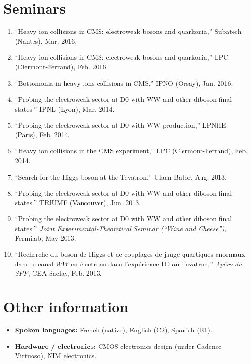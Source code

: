 \documentclass[a4paper,11pt]{article}
\begin{document}
\section*{Seminars}

 \begin{enumerate}
 \item ``Heavy ion collisions in CMS: electroweak bosons and quarkonia,'' Subatech (Nantes), Mar. 2016.
 \item ``Heavy ion collisions in CMS: electroweak bosons and quarkonia,'' LPC (Clermont-Ferrand), Feb. 2016.
 \item ``Bottomonia in heavy ions collisions in CMS,'' IPNO (Orsay), Jan. 2016.
 \item ``Probing the electroweak sector at D0 with WW and other diboson final states,'' IPNL (Lyon), Mar. 2014.
 \item ``Probing the electroweak sector at D0 with WW production,'' LPNHE (Paris), Feb. 2014.
 \item ``Heavy ion collisions in the CMS experiment,'' LPC (Clermont-Ferrand), Feb. 2014.
 \item ``Search for the Higgs boson at the Tevatron,'' Ulaan Bator, Aug. 2013.
 \item ``Probing the electroweak sector at D0 with WW and other diboson final states,'' TRIUMF (Vancouver), Jun. 2013.
 \item ``Probing the electroweak sector at D0 with WW and other diboson final states,'' \emph{Joint 
Experimental-Theoretical Seminar (``Wine and Cheese'')}, Fermilab, May 2013.
 \item ``Recherche du boson de Higgs et de couplages de jauge quartiques anormaux dans le canal $WW$ en électrons dans 
l'expérience D0 au Tevatron,'' \emph{Apéro du SPP}, CEA Saclay, Feb. 2013.
\end{enumerate}

\section*{Other information}

\begin{itemize}
 \item {\bf Spoken languages:} French (native), English (C2), Spanish (B1).
 \item {\bf Hardware / electronics:} CMOS electronics design (under Cadence Virtuoso), NIM electronics.
\end{itemize}
\end{document}
